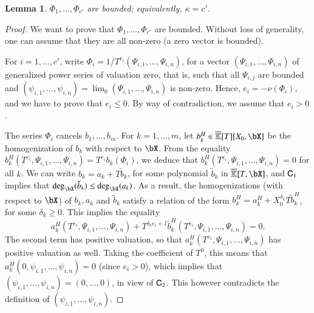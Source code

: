 \documentclass[amsthm]{elsart}
\newtheorem{lemma}[definition]{Lemma}
\begin{document}
\begin{lemma}
   $\Phi_1,\dots,\Phi_{c'}$ are bounded; equivalently, $\kappa=c'$.
\end{lemma}
\begin{proof}
  We want to prove that $\Phi_1,\dots,\Phi_{c'}$ are bounded. Without
  loss of generality, one can assume that they are all non-zero (a
  zero vector is bounded).

  For $i=1,\dots,c'$, write
  $\Phi_i=1/T^{e_i} (\Psi_{i,1},\dots,\Psi_{i,n})$, for a vector
  $(\Psi_{i,1},\dots,\Psi_{i,n})$ of generalized power  series of valuation zero,
  that is, such that all $\Psi_{i,j}$ are bounded and
  $(\psi_{i,1},\dots,\psi_{i,n})=\lim_0(\Psi_{i,1},\dots,\Psi_{i,n})$
  is non-zero. Hence, $e_i=-\nu(\Phi_i)$, and we have to prove that
  $e_i \le 0$.  By way of contradiction, we assume that $e_i > 0$.

  The series $\Phi_i$ cancels $b_1,\dots,b_m$. For $k=1,\dots,m$, let
  $b_k^H \in \KKbar[T][X_0,\bX]$ be the homogenization of $b_k$ with
  respect to $\bX$. From the equality
  $b_k^H(T^{e_i},\Psi_{i,1},\dots,\Psi_{i,n})= T^{e_i}b_k(\Phi_i)$, we
  deduce that $b_k^H(T^{e_i},\Psi_{i,1},\dots,\Psi_{i,n})=0$ for all
  $k$. We can write $b_k = a_{k} + T \tilde b_k$, for some
  polynomial $\tilde b_k$ in $\KKbar[T,\bX]$, and $\mathsf{C}_1$ implies
  that $\deg_\bX(\tilde b_k) \le \deg_\bX(a_{k})$. As a result, the
  homogenizations (with respect to $\bX$) of $b_{k},a_{k}$ and
  $\tilde b_k$ satisfy a relation of the form
  $b^H_k = a_{k}^H + X_0^{\delta_k} T \tilde b^H_k$, for some
  $\delta_k \ge 0$. This implies the equality
  $$a_{k}^H(T^{e_i},\Psi_{i,1},\dots,\Psi_{i,n}) + T^{\delta_k
    e_i+1}\tilde b_k^H(T^{e_i},\Psi_{i,1},\dots,\Psi_{i,n})=0.$$ The
  second term has positive valuation, so that
  $a_{k}^H(T^{e_i},\Psi_{i,1},\dots,\Psi_{i,n})$ has positive
  valuation as well. Taking the coefficient of $T^0$, this means that
  $a_{k}^H(0,\psi_{i,1},\dots,\psi_{i,n})=0$ (since $e_i > 0$),
  which implies that $(\psi_{i,1},\dots,\psi_{i,n})=(0,\dots,0)$, in
  view of $\mathsf{C}_2$.  This however contradicts the definition of
  $(\psi_{i,1},\dots,\psi_{i,n})$.
\end{proof}
\end{document}
